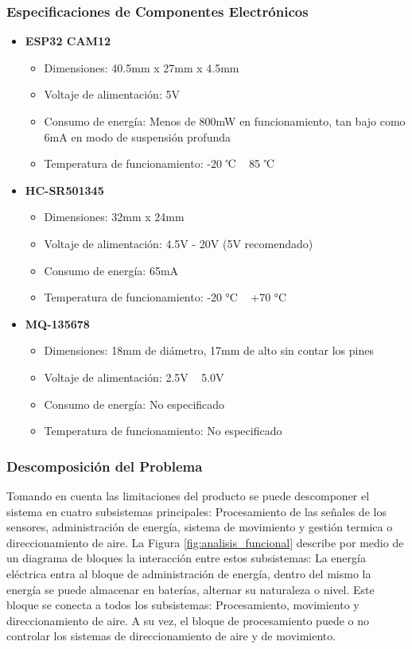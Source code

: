 \subsubsection{Especificaciones de Componentes Electrónicos}
\begin{itemize}
    \needspace{3cm}
    \item \textbf{ESP32 CAM12}
    \begin{itemize}
        \item Dimensiones: 40.5mm x 27mm x 4.5mm
        \item Voltaje de alimentación: 5V
        \item Consumo de energía: Menos de 800mW en funcionamiento, tan bajo como 6mA en modo de suspensión profunda
        \item Temperatura de funcionamiento: -20 ℃ ~ 85 ℃
    \end{itemize}
    
    \needspace{3cm}
    \item \textbf{HC-SR501345}
    \begin{itemize}
        \item Dimensiones: 32mm x 24mm
        \item Voltaje de alimentación: 4.5V - 20V (5V recomendado)
        \item Consumo de energía: 65mA
        \item Temperatura de funcionamiento: -20 °C ~ +70 °C
    \end{itemize}

    \needspace{5cm}
    \item \textbf{MQ-135678}
    \begin{itemize}
        \item Dimensiones: 18mm de diámetro, 17mm de alto sin contar los pines
        \item Voltaje de alimentación: 2.5V ~ 5.0V
        \item Consumo de energía: No especificado
        \item Temperatura de funcionamiento: No especificado
    \end{itemize}
\end{itemize}

\subsubsection{Descomposición del Problema}
Tomando en cuenta las limitaciones del producto se puede descomponer el sistema en cuatro subsistemas principales: Procesamiento de las señales de los sensores, administración de energía, sistema de movimiento y gestión termica o direccionamiento de aire. La Figura \ref{fig:analisis_funcional} describe por medio de un diagrama de bloques la interacción entre estos subsistemas: La energía eléctrica entra al bloque de administración de energía, dentro del mismo la energía se puede almacenar en baterías, alternar su naturaleza o nivel. Este bloque se conecta a todos los subsistemas: Procesamiento, movimiento y direccionamiento de aire. A su vez, el bloque de procesamiento puede o no controlar los sistemas de direccionamiento de aire y de movimiento.

